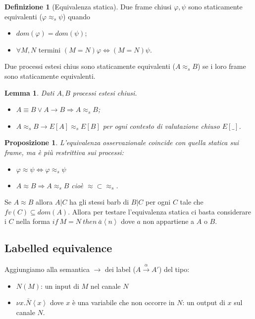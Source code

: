 \documentclass[a4paper,12pt]{article}
\theoremstyle{plain}
\newtheorem{mylem}{Lemma}[section]
\newtheorem{mypro}{Proposizione}[section]
\theoremstyle{definition}
\newtheorem{mydef}{Definizione}[section]
\theoremstyle{remark}
\newcommand{\ang}[1]{\left<#1\right>}
\begin{document}
\begin{mydef}[Equivalenza statica]
  Due frame chiusi $\varphi, \psi$ sono staticamente equivalenti
  ($\varphi \approx _s \psi$) quando 
  \begin{itemize}
  \item $dom(\varphi) = dom(\psi)$;
  \item $\forall M,N$ termini $(M=N)\varphi \Leftrightarrow (M=N)\psi$.
  \end{itemize}
  Due processi estesi chius sono staticamente equivalenti ($A \approx
  _s B$) se i loro frame sono staticamente equivalenti.
\end{mydef}

\begin{mylem}
  Dati $A,B$ processi estesi chiusi.
  \begin{itemize}
  \item $A \equiv B \vee A \rightarrow B \Rightarrow A \approx _s B$;
  \item $A \approx _s B \rightarrow E[A] \approx _s E[B]$ per ogni
    contesto di valutazione chiuso $E[\_]$.
  \end{itemize}
\end{mylem}

\begin{mypro}
  L'equivalenza osservazionale coincide con quella statica sui frame,
  ma \`e pi\`u restrittiva sui processi:
  \begin{itemize}
  \item $\varphi \approx \psi \Leftrightarrow \varphi \approx _s \psi$
  \item $A \approx B \Rightarrow A \approx _s B$ cio\`e $\approx
    \subset \approx _s$.
  \end{itemize}
\end{mypro}

Se $A \approx B$ allora $A|C$ ha gli stessi barb di $B|C$ per ogni $C$
tale che $fv(C) \subseteq dom(A)$. Allora per testare l'equivalenza
statica ci basta considerare i $C$ nella forma $if\ M=N\ then\ \bar
a\ang{n}$ dove $a$ non appartiene a $A$ o $B$.

\subsection{Labelled equivalence}

Aggiungiamo alla semantica $\rightarrow$ dei label ($A
\xrightarrow{\alpha} A'$) del tipo:
\begin{itemize}
\item $N(M)$: un input di $M$ nel canale $N$
\item $\nu x. \bar N \ang{x}$ dove $x$ \`e una variabile che non
  occorre in $N$: un output di $x$ sul canale $N$.
\end{itemize}
\end{document}
